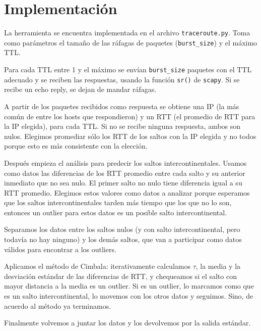 \section{Implementación}
La herramienta se encuentra implementada en el archivo \texttt{traceroute.py}. Toma como parámetros el tamaño de las ráfagas de paquetes (\texttt{burst\_size}) y el máximo TTL.

Para cada TTL entre 1 y el máximo se envían \texttt{burst\_size} paquetes con el TTL adecuado y se reciben las respuestas, usando la función \texttt{sr()} de \texttt{scapy}. Si se recibe un echo reply, se dejan de mandar ráfagas.

A partir de los paquetes recibidos como respuesta se obtiene una IP (la más común de entre los hosts que respondieron) y un RTT (el promedio de RTT para la IP elegida), para cada TTL. Si no se recibe ninguna respuesta, ambos son nulos. Elegimos promediar sólo los RTT de los saltos con la IP elegida y no todos porque esto es más consistente con la elección.

Después empieza el análisis para predecir los saltos intercontinentales. Usamos como datos las diferencias de los RTT promedio entre cada salto y su anterior inmediato que no sea nulo. El primer salto no nulo tiene diferencia igual a su RTT promedio. Elegimos estos valores como datos a analizar porque esperamos que los saltos intercontinentales tarden más tiempo que los que no lo son, entonces un outlier para estos datos es un posible salto intercontinental.

Separamos los datos entre los saltos nulos (y con salto intercontinental, pero todavía no hay ninguno) y los demás saltos, que van a participar como datos válidos para encontrar a los outliers.

Aplicamos el método de Cimbala: iterativamente calculamos $\tau$, la media y la desviación estándar de las diferencias de RTT, y chequeamos si el salto con mayor distancia a la media es un outlier. Si es un outlier, lo marcamos como que es un salto intercontinental, lo movemos con los otros datos y seguimos. Sino, de acuerdo al método ya terminamos.

Finalmente volvemos a juntar los datos y los devolvemos por la salida estándar.

